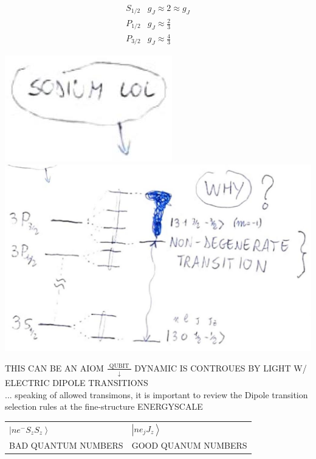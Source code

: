 \documentclass[10pt]{article}
\begin{document}
$$
\begin{array}{ll}
S_{1 / 2} & g_{J} \approx 2 \approx g_{J} \\
P_{1 / 2} & g_{J} \approx \frac{2}{3} \\
P_{3 / 2} & g_{J} \approx \frac{4}{3}
\end{array}
$$

\includegraphics[max width=\textwidth, center]{2025_10_16_e34e240cf6beac2f9e0dg-7}\\
\includegraphics[max width=\textwidth, center]{2025_10_16_e34e240cf6beac2f9e0dg-7(1)}

THIS CAN BE AN AIOM $\frac{\text { QUBIT }}{\downarrow}$ DYNAMIC IS CONTROUES BY LIGHT W/ ELECTRIC DIPOLE TRANSITIONS\\
... speaking of allowed transimons, it is important to review the Dipole transition selection rules at the fine-structure ENERGYSCALE

\begin{center}
\begin{tabular}{ll}
$\left|n e^{-} S_{z} S_{z}\right\rangle$ & $\left|n e_{j} J_{z}\right\rangle$ \\
BAD QUANTUM NUMBERS & GOOD QUANUM NUMBERS \\
\end{tabular}
\end{center}
\end{document}

